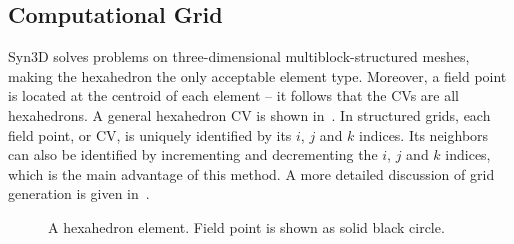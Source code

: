 \subsection{Computational Grid}
%
\label{sec:synmesh}
Syn3D solves problems on three-dimensional multiblock-structured meshes, making the hexahedron the only acceptable element type. Moreover, a field point is located at the centroid of each element -- it follows that the CVs are all hexahedrons. A general hexahedron CV is shown in~. In structured grids, each field point, or CV, is uniquely identified by its $i$, $j$ and $k$ indices. Its neighbors can also be identified by incrementing and decrementing the $i$, $j$ and $k$ indices, which is the main advantage of this method.
A more detailed discussion of grid generation is given in~\cite{blazek2015computational}.
\begin{figure}
\centering
    
\caption{A hexahedron element. Field point is shown as solid black circle.}\label{fig:hex}
\end{figure}

%  
%
%


%

